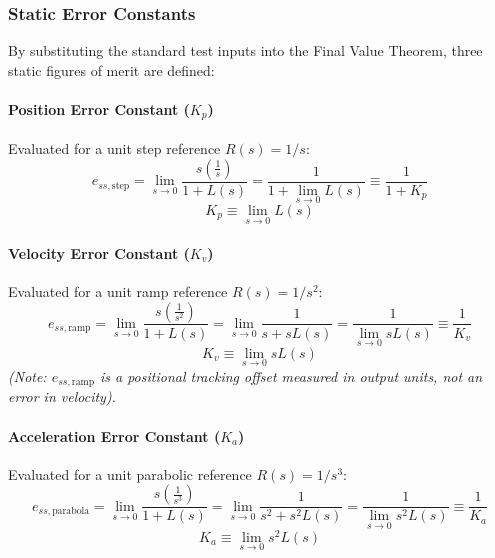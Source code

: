 \documentclass[12pt,onecolumn,twoside ]{article}
\begin{document}
	\subsubsection{Static Error Constants}
	By substituting the standard test inputs into the Final Value Theorem, three static figures of merit are defined:
	\paragraph{Position Error Constant ($K_p$)}
	Evaluated for a unit step reference $R(s) = 1/s$: \[
	e_{ss,\text{step}} = \lim_{s \to 0} \frac{s \left(\frac{1}{s}\right)}{1 + L(s)} = \frac{1}{1 + \lim_{s \to 0} L(s)} \equiv \frac{1}{1 + K_p}
	\] \[
	K_p \equiv \lim_{s \to 0} L(s)
	\]
	\paragraph{Velocity Error Constant ($K_v$)}
	Evaluated for a unit ramp reference $R(s) = 1/s^2$: \[
	e_{ss,\text{ramp}} = \lim_{s \to 0} \frac{s \left(\frac{1}{s^2}\right)}{1 + L(s)} = \lim_{s \to 0} \frac{1}{s + sL(s)} = \frac{1}{\lim_{s \to 0} s L(s)} \equiv \frac{1}{K_v}
	\] \[
	K_v \equiv \lim_{s \to 0} s L(s)
	\] \textit{(Note: $e_{ss,\text{ramp}}$ is a positional tracking offset measured in output units, not an error in velocity).}
	\paragraph{Acceleration Error Constant ($K_a$)}
	Evaluated for a unit parabolic reference $R(s) = 1/s^3$: \[
	e_{ss,\text{parabola}} = \lim_{s \to 0} \frac{s \left(\frac{1}{s^3}\right)}{1 + L(s)} = \lim_{s \to 0} \frac{1}{s^2 + s^2L(s)} = \frac{1}{\lim_{s \to 0} s^2 L(s)} \equiv \frac{1}{K_a}
	\] \[
	K_a \equiv \lim_{s \to 0} s^2 L(s)
	\]
	
\end{document}
